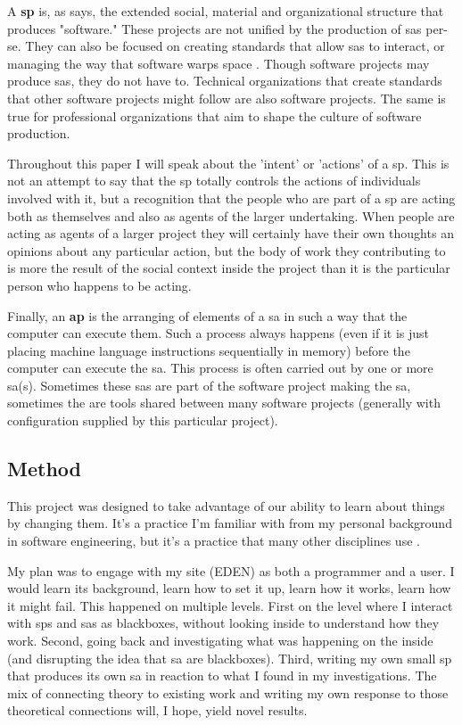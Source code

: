 \documentclass[a4paper,man,natbib,floatsintext]{apa6}
\begin{document}
  A \textbf{\gls{sp}} is, as \citet{Mackenzie2006-hb} says, the extended social, material and organizational structure that produces "software." These projects are not unified by the production of \glspl{sa} per-se. They can also be focused on creating standards that allow \glspl{sa} to interact, or managing the way that software warps space \citep{Kitchin2011-af}. Though software projects may produce \glspl{sa}, they do not have to. Technical organizations that create standards that other software projects might follow are also software projects. The same is true for professional organizations that aim to shape the culture of software production. 

  Throughout this paper I will speak about the 'intent' or 'actions' of a \gls{sp}. This is not an attempt to say that the \gls{sp} totally controls the actions of individuals involved with it, but a recognition that the people who are part of a \gls{sp} are acting both as themselves and also as agents of the larger undertaking. When people are acting as agents of a larger project they will certainly have their own thoughts an opinions about any particular action, but the body of work they contributing to is more the result of the social context inside the project than it is the particular person who happens to be acting.

  Finally, an \textbf{\gls{ap}} is the arranging of elements of a \gls{sa} in such a way that the computer can execute them. Such a process always happens (even if it is just placing machine language instructions sequentially in memory) before the computer can execute the \gls{sa}. This process is often carried out by one or more \gls{sa}(s). Sometimes these \glspl{sa} are part of the software project making the \gls{sa}, sometimes the are tools shared between many software projects (generally with configuration supplied by this particular project).

  \subsection{Method}
  This project was designed to take advantage of our ability to learn about things by changing them. It's a practice I'm familiar with from my personal background in software engineering, but it's a practice that many other disciplines use \citep{Zuiderent-Jerak2015-go}. 

  My plan was to engage with my site (\gls{EDEN}) as both a programmer and a user. I would learn its background, learn how to set it up, learn how it works, learn how it might fail. This happened on multiple levels. First on the level where I interact with \glspl{sp} and \glspl{sa} as blackboxes, without looking inside to understand how they work. Second, going back and investigating what was happening on the inside (and disrupting the idea that \gls{sa} are blackboxes). Third, writing my own small \gls{sp} that produces its own \gls{sa} in reaction to what I found in my investigations. The mix of connecting theory to existing work and writing my own response to those theoretical connections will, I hope, yield novel results.
\end{document}
